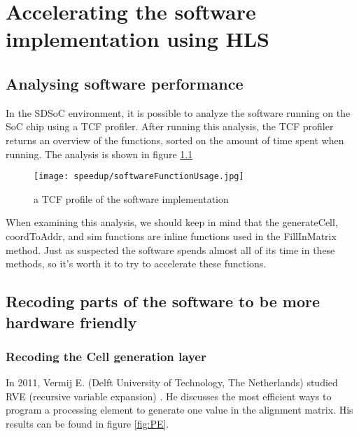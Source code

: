 
\chapter{Accelerating the software implementation using HLS}
\label{ch:HardwareImpl}

\section{Analysing software performance}
\label{swAnalyse}

In the SDSoC environment, it is possible to analyze the software running on the SoC chip using a TCF profiler. After running this analysis, the TCF profiler returns an overview of the functions, sorted on the amount of time spent when running. The analysis is shown in figure \ref{fig:softwareFunctionUsage}

\begin{figure}[H]
	\centering
	\texttt{[image: speedup/softwareFunctionUsage.jpg]}
	\caption{a TCF profile of the software implementation}
	\label{fig:softwareFunctionUsage}
\end{figure}

When examining this analysis, we should keep in mind that the generateCell, coordToAddr, and sim functions are inline functions used in the FillInMatrix method. Just as suspected the software spends almost all of its time in these methods, so it's worth it to try to accelerate these functions.

\section{Recoding parts of the software to be more hardware friendly}

\subsection{Recoding the Cell generation layer}

In 2011, Vermij E. (Delft University of Technology, The Netherlands) studied RVE (recursive variable expansion) \cite{Vermij}. He discusses the most efficient ways to program a processing element to generate one value in the alignment matrix. His results can be found in figure \ref{fig:PE}. 

